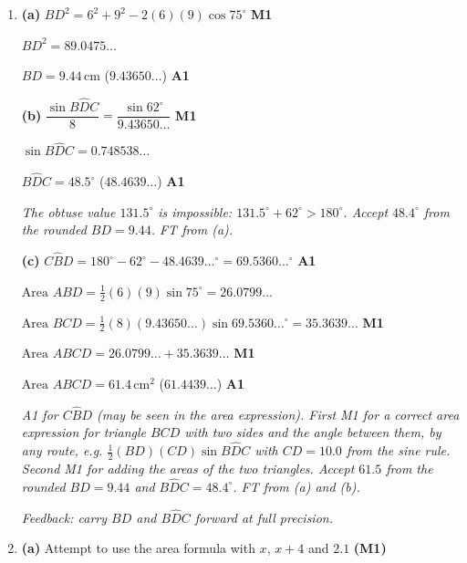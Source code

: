 \documentclass[12pt, twoside]{article}
\begin{document}
\begin{enumerate}[itemsep=0.3cm]
\newpage

\item[5.] [Maximum mark: 8]

\textbf{(a)} $BD^{2} = 6^{2} + 9^{2} - 2(6)(9)\cos 75^\circ$ \hfill \textbf{M1}

$BD^{2} = 89.0475\ldots$

$BD = 9.44\,\text{cm}$ \quad ($9.43650\ldots$) \hfill \textbf{A1}

\textbf{(b)} $\dfrac{\sin B\hat{D}C}{8} = \dfrac{\sin 62^\circ}{9.43650\ldots}$ \hfill \textbf{M1}

$\sin B\hat{D}C = 0.748538\ldots$

$B\hat{D}C = 48.5^\circ$ \quad ($48.4639\ldots$) \hfill \textbf{A1}

\emph{The obtuse value $131.5^\circ$ is impossible:
$131.5^\circ + 62^\circ > 180^\circ$. Accept $48.4^\circ$ from the rounded
$BD = 9.44$. FT from (a).}

\textbf{(c)} $C\hat{B}D = 180^\circ - 62^\circ - 48.4639\ldots^\circ = 69.5360\ldots^\circ$ \hfill \textbf{A1}

$\text{Area } ABD = \frac{1}{2}(6)(9)\sin 75^\circ = 26.0799\ldots$

$\text{Area } BCD = \frac{1}{2}(8)(9.43650\ldots)\sin 69.5360\ldots^\circ = 35.3639\ldots$ \hfill \textbf{M1}

$\text{Area } ABCD = 26.0799\ldots + 35.3639\ldots$ \hfill \textbf{M1}

$\text{Area } ABCD = 61.4\,\text{cm}^{2}$ \quad ($61.4439\ldots$) \hfill \textbf{A1}

\emph{A1 for $C\hat{B}D$ (may be seen in the area expression). First M1
for a correct area expression for triangle $BCD$ with two sides and the
angle between them, by any route, e.g. $\frac{1}{2}(BD)(CD)\sin B\hat{D}C$
with $CD = 10.0$ from the sine rule. Second M1 for adding the areas of
the two triangles. Accept $61.5$ from the rounded $BD = 9.44$ and
$B\hat{D}C = 48.4^\circ$. FT from (a) and (b).}

\emph{Feedback: carry $BD$ and $B\hat{D}C$ forward at full precision.}

\newpage

\item[6.] [Maximum mark: 7]

\textbf{(a)} Attempt to use the area formula with $x$, $x + 4$ and $2.1$ \hfill \textbf{(M1)}


\end{enumerate}
\end{document}
